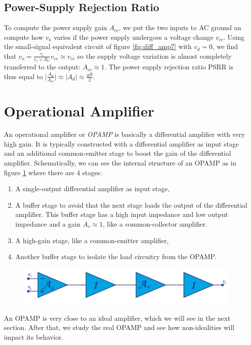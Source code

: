 \subsection{Power-Supply Rejection Ratio}
To compute the power supply gain $A_{cc}$, we put the two inputs to AC ground an compute how $v_o$ varies if the power supply undergoes a voltage change $v_{cc}$. Using the small-signal equivalent circuit of figure \ref{fig:diff_amp7} with $v_d=0$, we find that $v_o = \frac{r_c}{r_c + R_C} v_{cc} \approx v_{cc}$ so the supply voltage variation is almost completely transferred to the output: $A_{cc} \approx 1$. The power supply rejection ratio PSRR is thus equal to $\bigg| \frac{A_d}{A_{cc}}  \bigg| \approx |A_d| \approx \frac{gR}{2}$.

\section{Operational Amplifier}
\label{sec:opamp}
An operational amplifier or \emph{OPAMP} is basically a differential amplifier with very high gain. It is typically constructed with a differential amplifier as input stage and an additional common-emitter stage to boost the gain of the differential amplifier. Schematically, we can see the internal structure of an OPAMP as in figure 
\ref{fig:opamp1} where there are $4$ stages:
\begin{enumerate}
	\item A single-output differential amplifier as input stage,
	\item A buffer stage to avoid that the next stage loads the output of the differential amplifier. This buffer stage has a high input impedance and low output impedance and a gain $A_v \approx 1$, like a common-collector amplifier.
	\item A high-gain stage, like a common-emitter amplifier,
	\item Another buffer stage to isolate the load circuitry from the OPAMP.
\end{enumerate}
\begin{figure}[h!]
	\centering
	\includegraphics[width=14cm]{figures/ch02/opamp1.jpg}
	\caption{}
	\label{fig:opamp1}
\end{figure}
An OPAMP is very close to an ideal amplifier, which we will see in the next section. After that, we study the real OPAMP and see how non-idealities will impact its behavior.

